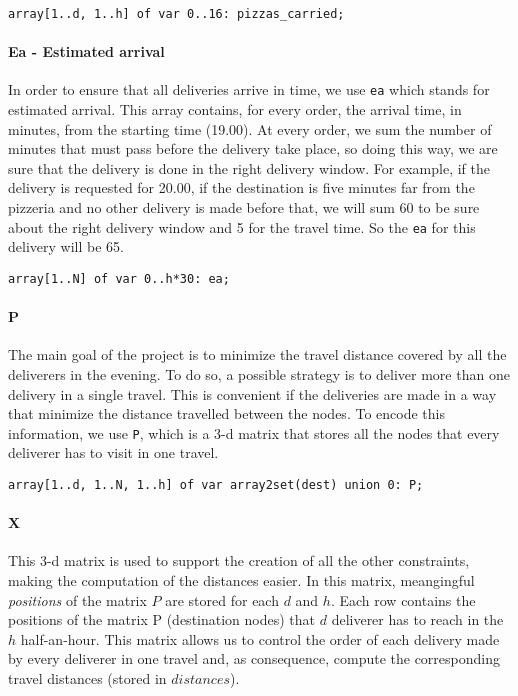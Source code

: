 \documentclass[10pt]{article}
\begin{document}
	\begin{center}
		\texttt{array[1..d, 1..h] of var 0..16: pizzas\_carried;}
	\end{center}

	\paragraph*{Ea - Estimated arrival}
	In order to ensure that all deliveries arrive in time, we use \texttt{ea} which
	stands for estimated arrival. This array contains, for every order, the arrival 
	time, in minutes, from the starting time (19.00). At every order, we sum the number 
	of minutes that must pass before the delivery take place, so doing this way,
	we are sure that the delivery is done in the right delivery window.
	For example, if the delivery is requested for 20.00, if the destination is five minutes 
	far from the pizzeria and no other delivery is made before that, we will sum 60 to 
	be sure about the right delivery window and 5 for the travel time. So the \texttt{ea}
	for this delivery will be 65.
	
	\begin{center}
		\texttt{array[1..N] of var 0..h*30: ea;}
	\end{center}
	

	\paragraph*{P} The main goal of the project is to minimize the travel distance 
	covered by all the deliverers in the evening. To do so, a possible strategy
	is to deliver more than one delivery in a single travel. This is convenient 
	if the deliveries are made in a way that minimize the distance travelled between the nodes.
	To encode this information, we use \texttt{P}, which is a 3-d matrix that stores
	all the nodes that every deliverer has to visit in one travel. 

	\begin{center}
		\texttt{array[1..d, 1..N, 1..h] of var array2set(dest) union {0}: P;}
	\end{center}
	
	\paragraph*{X} This 3-d matrix is used to support the creation of all the other 
	constraints, making the computation of the distances easier.
	In this matrix, meangingful \textit{positions} of the matrix $P$ are stored for each 
	$d$ and $h$. Each row contains the positions of the matrix P (destination nodes) 
	that $d$ deliverer has to reach in the $h$ half-an-hour. This matrix allows 
	us to control the order of each delivery made by every deliverer in one travel
	and, as consequence, compute the corresponding travel distances (stored in $distances$).
\end{document}
